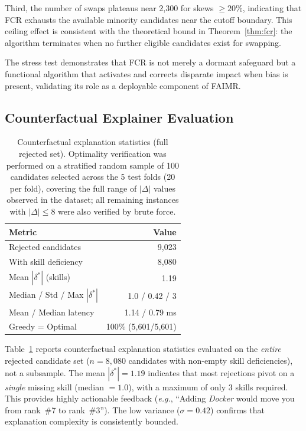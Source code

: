 \documentclass{llncs}
\begin{document}
Third, the number of swaps plateaus near 2,300 for skews $\geq 20\%$, indicating that FCR exhausts the available minority candidates near the cutoff boundary. This ceiling effect is consistent with the theoretical bound in Theorem~\ref{thm:fcr}: the algorithm terminates when no further eligible candidates exist for swapping.

The stress test demonstrates that FCR is not merely a dormant safeguard but a functional algorithm that activates and corrects disparate impact when bias is present, validating its role as a deployable component of FAIMR.

\subsection{Counterfactual Explainer Evaluation}

\begin{table}[t]
\centering
\caption{Counterfactual explanation statistics (full rejected set). Optimality verification was performed on a stratified random sample of 100 candidates selected across the 5 test folds (20 per fold), covering the full range of $|\Delta|$ values observed in the dataset; all remaining instances with $|\Delta| \leq 8$ were also verified by brute force.}
\label{tab:counterfactual}
{\small
\begin{tabular}{@{}lr@{}}
\toprule
Metric & Value \\
\midrule
Rejected candidates & 9,023 \\
With skill deficiency & 8,080 \\
Mean $|\delta^*|$ (skills) & 1.19 \\
Median / Std / Max $|\delta^*|$ & 1.0 / 0.42 / 3 \\
Mean / Median latency & 1.14 / 0.79 ms \\
Greedy = Optimal & 100\% (5,601/5,601) \\
\bottomrule
\end{tabular}}
\end{table}

Table~\ref{tab:counterfactual} reports counterfactual explanation statistics evaluated on the \textit{entire} rejected candidate set ($n = 8{,}080$ candidates with non-empty skill deficiencies), not a subsample. The mean $|\delta^*| = 1.19$ indicates that most rejections pivot on a \textit{single} missing skill (median $= 1.0$), with a maximum of only 3 skills required. This provides highly actionable feedback (\textit{e.g.}, ``Adding \textit{Docker} would move you from rank~\#7 to rank~\#3''). The low variance ($\sigma = 0.42$) confirms that explanation complexity is consistently bounded.
\end{document}
